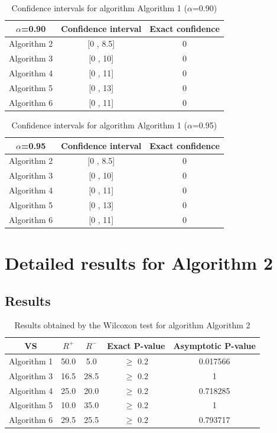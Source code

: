 \documentclass[a4paper,10pt]{article}
\begin{document}
\begin{table}[!htp]
\centering\small
\begin{tabular}{
|c|c|c|}
\hline
 $\alpha$=0.90 & Confidence interval & Exact confidence \\ \hline 
Algorithm 2 & [0 , 8.5] & 0\\ \hline 
Algorithm 3 & [0 , 10] & 0\\ \hline 
Algorithm 4 & [0 , 11] & 0\\ \hline 
Algorithm 5 & [0 , 13] & 0\\ \hline 
Algorithm 6 & [0 , 11] & 0\\ \hline 

\end{tabular}
\caption{Confidence intervals for algorithm Algorithm 1 ($\alpha$=0.90)}
\end{table}
\begin{table}[!htp]
\centering\small
\begin{tabular}{
|c|c|c|}
\hline
 $\alpha$=0.95 & Confidence interval & Exact confidence \\ \hline 
Algorithm 2 & [0 , 8.5] & 0\\ \hline 
Algorithm 3 & [0 , 10] & 0\\ \hline 
Algorithm 4 & [0 , 11] & 0\\ \hline 
Algorithm 5 & [0 , 13] & 0\\ \hline 
Algorithm 6 & [0 , 11] & 0\\ \hline 

\end{tabular}
\caption{Confidence intervals for algorithm Algorithm 1 ($\alpha$=0.95)}
\end{table}

 \clearpage 


\section{Detailed results for Algorithm 2}


\subsection{Results}

\begin{table}[!htp]
\centering\small
\begin{tabular}{
|c|c|c|c|c|}
\hline
 VS & $R^{+}$ & $R^{-}$ & Exact P-value & Asymptotic P-value \\ \hline 
Algorithm 1 & 50.0 & 5.0 & $\geq$ 0.2 & 0.017566\\ \hline 
Algorithm 3 & 16.5 & 28.5 & $\geq$ 0.2 & 1\\ \hline 
Algorithm 4 & 25.0 & 20.0 & $\geq$ 0.2 & 0.718285\\ \hline 
Algorithm 5 & 10.0 & 35.0 & $\geq$ 0.2 & 1\\ \hline 
Algorithm 6 & 29.5 & 25.5 & $\geq$ 0.2 & 0.793717\\ \hline 

\end{tabular}
\caption{Results obtained by the Wilcoxon test for algorithm Algorithm 2}
\end{table}
\end{document}
